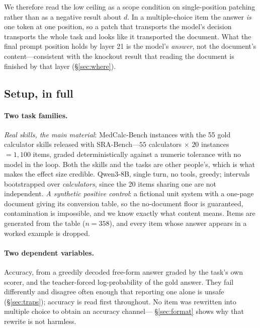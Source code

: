 \documentclass{article}
\newcommand{\dvec}{\ensuremath{d}}
\begin{document}
We therefore read the low ceiling as a scope condition on single-position
patching rather than as a negative result about $\dvec$. In a multiple-choice
item the answer \emph{is} one token at one position, so a patch that transports
the model's decision transports the whole task and looks like it transported the
document. What the final prompt position holds by layer 21 is the model's
\emph{answer}, not the document's content---consistent with the knockout result
that reading the document is finished by that layer (\S\ref{sec:where}).

\subsection{Setup, in full}
\label{app:setup}

\paragraph{Two task families.} \emph{Real skills, the main material}:
MedCalc-Bench instances with the 55 gold calculator skills released with
SRA-Bench---$55$ calculators $\times$ $20$ instances $= 1{,}100$ items, graded
deterministically against a numeric tolerance with no model in the loop. Both
the skills and the tasks are other people's, which is what makes the effect size
credible. Qwen3-8B, single turn, no tools, greedy; intervals bootstrapped over
\emph{calculators}, since the 20 items sharing one are not independent.
\emph{A synthetic positive control}: a fictional unit system with a one-page
document giving its conversion table, so the no-document floor is guaranteed,
contamination is impossible, and we know exactly what content means. Items are
generated from the table ($n=358$), and every item whose answer appears in a
worked example is dropped.

\paragraph{Two dependent variables.} Accuracy, from a greedily decoded free-form
answer graded by the task's own scorer, and the teacher-forced log-probability of
the gold answer. They fail differently and disagree often enough that reporting
one alone is unsafe (\S\ref{sec:traps}); accuracy is read first throughout. No
item was rewritten into multiple choice to obtain an accuracy channel---%
\S\ref{sec:format} shows why that rewrite is not harmless.
\end{document}
